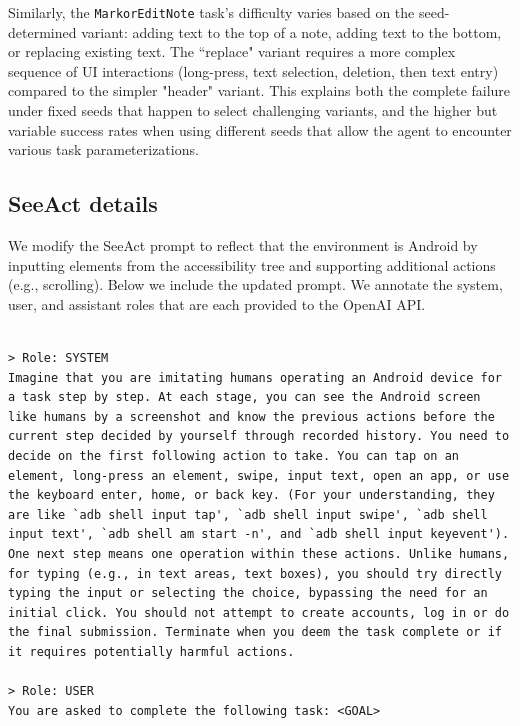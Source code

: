 \documentclass{article}
\begin{document}
\begin{appendices}
Similarly, the \texttt{MarkorEditNote} task's difficulty varies based on the seed-determined variant: adding text to the top of a note, adding text to the bottom, or replacing existing text. The ``replace" variant requires a more complex sequence of UI interactions (long-press, text selection, deletion, then text entry) compared to the simpler "header" variant. This explains both the complete failure under fixed seeds that happen to select challenging variants, and the higher but variable success rates when using different seeds that allow the agent to encounter various task parameterizations.

\subsection{SeeAct details}
\label{sec:seeact_prompt}

We modify the SeeAct prompt \citep{zheng2023seeact} to reflect that the environment is Android by inputting elements from the accessibility tree and supporting additional actions (e.g., scrolling). Below we include the updated prompt. We annotate the system, user, and assistant roles that are each provided to the OpenAI API.

\begin{lstlisting}[basicstyle=\ttfamily\footnotesize,breaklines=true,language={}, style=mystyle, keywordstyle=\color{black}]
  
> Role: SYSTEM
Imagine that you are imitating humans operating an Android device for a task step by step. At each stage, you can see the Android screen like humans by a screenshot and know the previous actions before the current step decided by yourself through recorded history. You need to decide on the first following action to take. You can tap on an element, long-press an element, swipe, input text, open an app, or use the keyboard enter, home, or back key. (For your understanding, they are like `adb shell input tap', `adb shell input swipe', `adb shell input text', `adb shell am start -n', and `adb shell input keyevent'). One next step means one operation within these actions. Unlike humans, for typing (e.g., in text areas, text boxes), you should try directly typing the input or selecting the choice, bypassing the need for an initial click. You should not attempt to create accounts, log in or do the final submission. Terminate when you deem the task complete or if it requires potentially harmful actions.

> Role: USER
You are asked to complete the following task: <GOAL>


\end{lstlisting}
\end{appendices}
\end{document}
